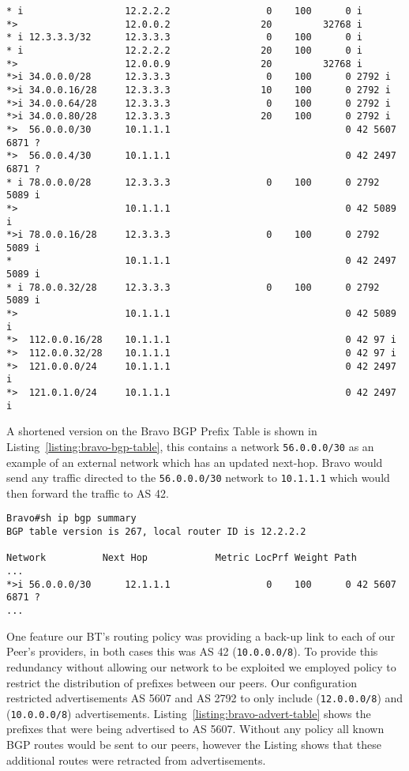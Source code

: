 \begin{lstlisting}[caption={Extract of Alpha BGP Table}, label={listing:bgp-table}]
* i                  12.2.2.2                 0    100      0 i
*>                   12.0.0.2                20         32768 i
* i 12.3.3.3/32      12.3.3.3                 0    100      0 i
* i                  12.2.2.2                20    100      0 i
*>                   12.0.0.9                20         32768 i
*>i 34.0.0.0/28      12.3.3.3                 0    100      0 2792 i
*>i 34.0.0.16/28     12.3.3.3                10    100      0 2792 i
*>i 34.0.0.64/28     12.3.3.3                 0    100      0 2792 i
*>i 34.0.0.80/28     12.3.3.3                20    100      0 2792 i
*>  56.0.0.0/30      10.1.1.1                               0 42 5607 6871 ?
*>  56.0.0.4/30      10.1.1.1                               0 42 2497 6871 ?
* i 78.0.0.0/28      12.3.3.3                 0    100      0 2792 5089 i
*>                   10.1.1.1                               0 42 5089 i
*>i 78.0.0.16/28     12.3.3.3                 0    100      0 2792 5089 i
*                    10.1.1.1                               0 42 2497 5089 i
* i 78.0.0.32/28     12.3.3.3                 0    100      0 2792 5089 i
*>                   10.1.1.1                               0 42 5089 i
*>  112.0.0.16/28    10.1.1.1                               0 42 97 i
*>  112.0.0.32/28    10.1.1.1                               0 42 97 i
*>  121.0.0.0/24     10.1.1.1                               0 42 2497 i
*>  121.0.1.0/24     10.1.1.1                               0 42 2497 i
\end{lstlisting}

A shortened version on the Bravo BGP Prefix Table is shown in
Listing~\ref{listing:bravo-bgp-table}, this contains a network
\texttt{56.0.0.0/30} as an example of an external network which has an updated
next-hop. Bravo would send any traffic directed to the \texttt{56.0.0.0/30}
network to \texttt{10.1.1.1} which would then forward the traffic to AS 42.

\begin{lstlisting}[caption={Extract of Bravo BGP Table}, label={listing:bravo-bgp-table}]
Bravo#sh ip bgp summary
BGP table version is 267, local router ID is 12.2.2.2

Network          Next Hop            Metric LocPrf Weight Path
...
*>i 56.0.0.0/30      12.1.1.1                 0    100      0 42 5607 6871 ?
...
\end{lstlisting}

One feature our BT's routing policy was providing a back-up link to each of our
Peer's providers, in both cases this was AS 42 (\texttt{10.0.0.0/8}). To
provide this redundancy without allowing our network to be exploited we
employed policy to restrict the distribution of prefixes between our peers. Our
configuration restricted advertisements AS 5607 and AS 2792 to only include
(\texttt{12.0.0.0/8}) and (\texttt{10.0.0.0/8}) advertisements.
Listing~\ref{listing:bravo-advert-table} shows the prefixes that were being
advertised to AS 5607. Without any policy all known BGP routes would be sent to
our peers, however the Listing shows that these additional routes were
retracted from advertisements.

